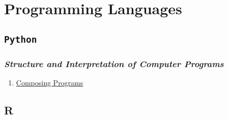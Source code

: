 \documentclass{article}
\date{\today}
\title{}
\begin{document}
\setcounter{secnumdepth}{-2}
\tableofcontents
\section{Programming Languages}
\label{sec:orgheadline4}
\subsection{\texttt{Python}}
\label{sec:orgheadline2}
\subsubsection{\emph{Structure and Interpretation of Computer Programs}}
\label{sec:orgheadline1}
\begin{enumerate}
\item \href{http://composingprograms.com/}{Composing Programs}
\end{enumerate}
\subsection{R}
\label{sec:orgheadline3}
\end{document}
